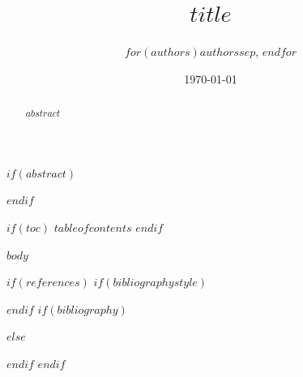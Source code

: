 \documentclass[11pt,a4paper]{article}
\title{$title$}
\author{$for(authors)$$authors$$sep$, $endfor$}
\date{\today}
\begin{document}
\maketitle
\setcounter{secnumdepth}{3}

$if(abstract)$
\begin{abstract}
$abstract$
\end{abstract}
$endif$

$if(toc)$
$tableofcontents$
\newpage
$endif$

$body$

$if(references)$
$if(bibliographystyle)$

$endif$
$if(bibliography)$

$else$

$endif$
$endif$
\end{document}
